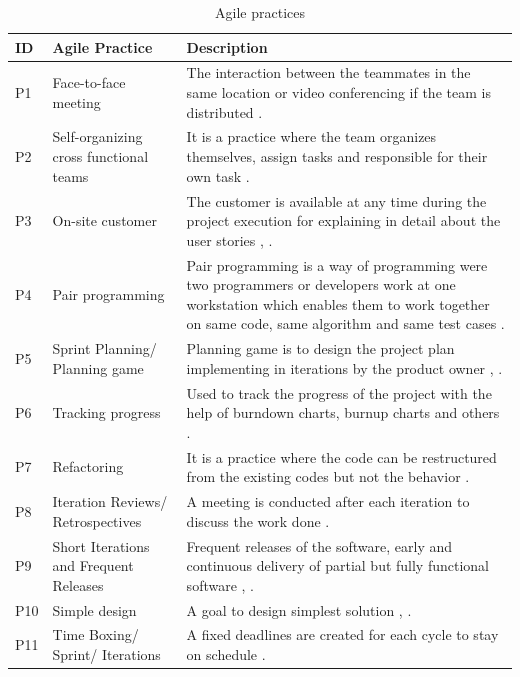 \documentclass[a4paper,oneside]{bth}
\begin{document}
\begin{longtable}{|l|p{4cm}|p{8cm}|}
\caption{Agile practices}\\ \hline
\label{agile practices}
\textbf{ID} & \textbf{Agile Practice} & \textbf{Description}\\
\hline
P1 & Face-to-face meeting & The interaction between the teammates in the same location or video conferencing if the team is distributed \cite{martin_agile_2003}.\\ \hline
P2 & Self-organizing cross functional teams & It is a practice where the team organizes themselves, assign tasks and responsible for their own task \cite{moe_understanding_2008}.\\ \hline
P3 & On-site customer & The customer is available at any time during the project execution for explaining in detail about the user stories \cite{williams_agile_2010}, \cite{wang_assimilation_2012}.\\ \hline
P4 & Pair programming & Pair programming is a way of programming were two programmers or developers work at one workstation which enables them to work together on same code, same algorithm and same test cases \cite{williams_agile_2010}.\\ \hline
P5 & Sprint Planning/ Planning game & Planning game is to design the project plan implementing in iterations by the product owner \cite{nawrocki_toward_2001}, \cite{williams_agile_2010}.\\ \hline
P6 & Tracking progress & Used to track the progress of the project with the help of burndown charts, burnup charts and others \cite{williams_agile_2010}.\\ \hline
P7 & Refactoring & It is a practice where the code can be restructured from the existing codes but not the behavior \cite{nawrocki_toward_2001}.\\ \hline
P8 & Iteration Reviews/ Retrospectives & A meeting is conducted after each iteration to discuss the work done \cite{williams_agile_2010}.\\ \hline
P9 & Short Iterations and Frequent Releases & Frequent releases of the software, early and continuous delivery of partial but fully functional software \cite{williams_agile_2010}, \cite{martin_agile_2003}.\\ \hline
P10 & Simple design & A goal to design simplest solution \cite{wang_assimilation_2012}, \cite{martin_agile_2003}.\\ \hline
P11 & Time Boxing/ Sprint/ Iterations & A fixed deadlines are created for each cycle to stay on schedule \cite{petersen_effect_2010}.\\ \hline

\end{longtable}
\end{document}
